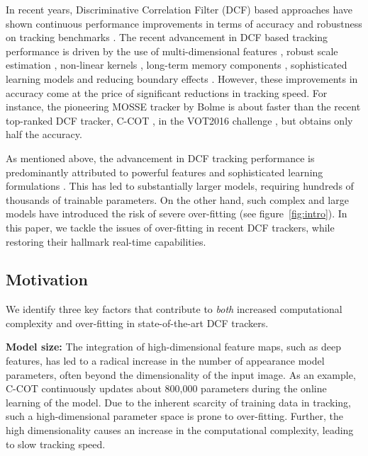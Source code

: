 \documentclass[10pt,twocolumn,letterpaper]{article}
\newcommand{\parsection}[1]{\noindent\textbf{#1:}}
\begin{document}
In recent years, Discriminative Correlation Filter (DCF) based approaches have shown continuous performance improvements in terms of accuracy and robustness on tracking benchmarks \cite{VOT2016,OTB2015}. The recent advancement in DCF based tracking performance is driven by the use of multi-dimensional features \cite{DanelljanCVPR14,galoogahiICCV13}, robust scale estimation \cite{DanelljanBMVC14,DanelljanTPAMI2016}, non-linear kernels \cite{Henriques14}, long-term memory components \cite{LTC_CVPR15}, sophisticated learning models \cite{KAUST_ECCV16,DanelljanCVPR2016a} and reducing boundary effects \cite{DanelljanICCV2015,GaloogahiCVPR2015}. However, these improvements in accuracy come at the price of significant reductions in tracking speed. For instance, the pioneering MOSSE tracker by Bolme \etal \cite{MOSSE2010} is about  faster than the recent top-ranked DCF tracker, C-COT \cite{DanelljanECCV2016}, in the VOT2016 challenge \cite{VOT2016}, but obtains only half the accuracy.

As mentioned above, the advancement in DCF tracking performance is predominantly attributed to powerful features and sophisticated learning formulations \cite{DanelljanVOT2015,DanelljanECCV2016,HCF_ICCV15}. This has led to substantially larger models, requiring hundreds of thousands of trainable parameters. On the other hand, such complex and large models have introduced the risk of severe over-fitting (see figure~\ref{fig:intro}). In this paper, we tackle the issues of over-fitting in recent DCF trackers, while restoring their hallmark real-time capabilities.

\subsection{Motivation}

We identify three key factors that contribute to \emph{both} increased computational complexity and over-fitting in state-of-the-art DCF trackers.

\parsection{Model size}
The integration of high-dimensional feature maps, such as deep features, has led to a radical increase in the number of appearance model parameters, often beyond the dimensionality of the input image. As an example, C-COT \cite{DanelljanECCV2016} continuously updates about 800,000 parameters during the online learning of the model. Due to the inherent scarcity of training data in tracking, such a high-dimensional parameter space is prone to over-fitting. Further, the high dimensionality causes an increase in the computational complexity, leading to slow tracking speed.
\end{document}
